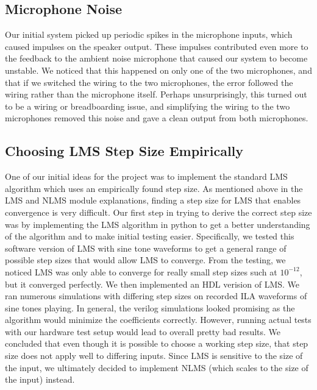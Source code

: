 \documentclass{fpgairpods}
\begin{document}
\subsection{Microphone Noise}
Our initial system picked up periodic spikes in the microphone inputs, which caused impulses on the speaker output. These impulses contributed even more to the feedback to the ambient noise microphone that caused our system to become unstable. We noticed that this happened on only one of the two microphones, and that if we switched the wiring to the two microphones, the error followed the wiring rather than the microphone itself. Perhaps unsurprisingly, this turned out to be a wiring or breadboarding issue, and simplifying the wiring to the two microphones removed this noise and gave a clean output from both microphones.

\subsection{Choosing LMS Step Size Empirically}
One of our initial ideas for the project was to implement the standard LMS algorithm which uses an empirically found step size. As mentioned above in the LMS and NLMS module explanations, finding a step size for LMS that enables convergence is very difficult. Our first step in trying to derive the correct step size was by implementing the LMS algorithm in python to get a better understanding of the algorithm and to make initial testing easier. Specifically, we tested this software version of LMS with sine tone waveforms to get a general range of possible step sizes that would allow LMS to converge. From the testing, we noticed LMS was only able to converge for really small step sizes such at $10^{-12}$, but it converged perfectly. We then implemented an HDL verision of LMS. We ran numerous simulations with differing step sizes on recorded ILA waveforms of sine tones playing. In general, the verilog simulations looked promising as the algorithm would minimize the coefficients correctly. However, running actual tests with our hardware test setup would lead to overall pretty bad results. We concluded that even though it is possible to choose a working step size, that step size does not apply well to differing inputs. Since LMS is sensitive to the size of the input, we ultimately decided to implement NLMS (which scales to the size of the input) instead.
\end{document}
